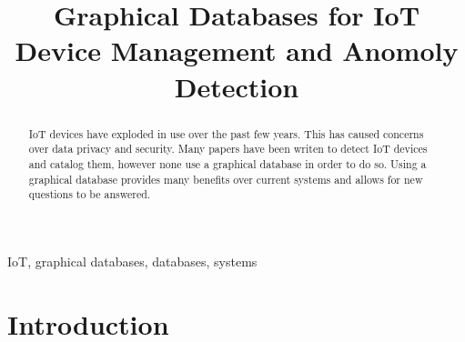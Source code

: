 \documentclass[conference]{IEEEtran}
\begin{document}
\title{Graphical Databases for IoT Device Management and Anomoly Detection}

\author{
}

\maketitle

\begin{abstract}
IoT devices have exploded in use over the past few years.
This has caused concerns over data privacy and security.
Many papers have been writen to detect IoT devices and catalog them,
however none use a graphical database in order to do so.
Using a graphical database provides many benefits over current systems
and allows for new questions to be answered.
\end{abstract}

\begin{IEEEkeywords}
IoT, graphical databases, databases, systems
\end{IEEEkeywords}

\section{Introduction}


\printbibliography
\end{document}
